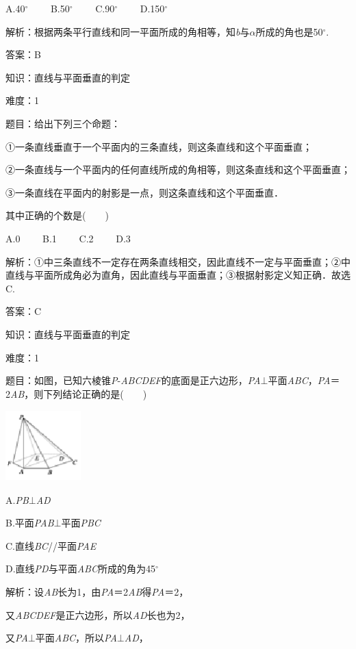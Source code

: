 \documentclass{article} %
\begin{document}
A.40$\mathrm{{}^\circ}$　　 B.50$\mathrm{{}^\circ}$　　 C.90$\mathrm{{}^\circ}$　　 D.150$\mathrm{{}^\circ}$

解析：根据两条平行直线和同一平面所成的角相等，知\textit{b}与\textit{$\alpha$}所成的角也是50$\mathrm{{}^\circ}$.

答案：B

知识：直线与平面垂直的判定

难度：1

题目：给出下列三个命题：

①一条直线垂直于一个平面内的三条直线，则这条直线和这个平面垂直；

②一条直线与一个平面内的任何直线所成的角相等，则这条直线和这个平面垂直；

③一条直线在平面内的射影是一点，则这条直线和这个平面垂直．

其中正确的个数是(　　)

A.0　　 B.1　　 C.2　　 D.3

解析：①中三条直线不一定存在两条直线相交，因此直线不一定与平面垂直；②中直线与平面所成角必为直角，因此直线与平面垂直；③根据射影定义知正确．故选C.

答案：C

知识：直线与平面垂直的判定

难度：1

题目：如图，已知六棱锥\textit{P}-\textit{ABCDEF}的底面是正六边形，\textit{PA}$\mathrm{\bot}$平面\textit{ABC}，\textit{PA}＝2\textit{AB}，则下列结论正确的是(　　)

\includegraphics*[width=1.15in, height=1.07in, keepaspectratio=false]{image195}

A.\textit{PB}$\mathrm{\bot}$\textit{AD}

B.平面\textit{PAB}$\mathrm{\bot}$平面\textit{PBC}

C.直线\textit{BC}//平面\textit{PAE}

D.直线\textit{PD}与平面\textit{ABC}所成的角为45$\mathrm{{}^\circ}$

解析：设\textit{AB}长为1，由\textit{PA}＝2\textit{AB}得\textit{PA}＝2，

又\textit{ABCDEF}是正六边形，所以\textit{AD}长也为2，

又\textit{PA}$\mathrm{\bot}$平面\textit{ABC}，所以\textit{PA}$\mathrm{\bot}$\textit{AD}，
\end{document}
